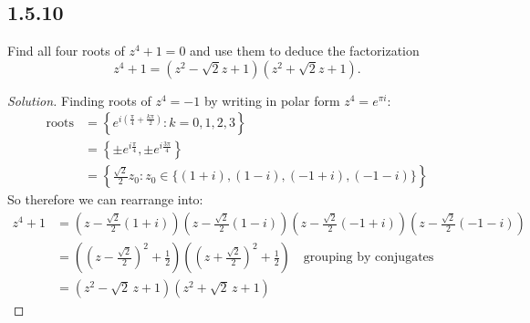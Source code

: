 \documentclass{article}
\newenvironment{solution}{
\begin{proof}[Solution]}{
\end{proof}}
\begin{document}
\subsection*{1.5.10}
Find all four roots of $z^4 + 1 = 0$ and use them to deduce the factorization
\[
  z^4 + 1 = (z^2 - \sqrt{2}z + 1)(z^2 + \sqrt{2}z + 1).
\]
\begin{solution}
  Finding roots of $z^4=-1$ by writing in polar form $z^4=e^{\pi i}$:
  \begin{align*}
    \text{roots}
    &= \left\{e^{i \left(\frac{\pi}{4} + \frac{k \pi}{2}\right)}: k = 0,1,2,3 \right\}
    \\ &= \left\{ \pm e^{i \frac{\pi}{4}}, \pm e^{i \frac{3\pi}{4}} \right\}
    \\ &= \left\{\tfrac{\sqrt{2}}{2}z_0: z_0 \in \{(1 + i),(1 - i),(-1 + i),(-1 - i)\} \right\}
  \end{align*}
  So therefore we can rearrange into:
  \begin{align*}
    z^4 + 1
    &= \left(z - \tfrac{\sqrt{2}}{2}(1 + i)\right)\left(z - \tfrac{\sqrt{2}}{2}(1 - i)\right)\left(z - \tfrac{\sqrt{2}}{2}(-1 + i)\right)\left(z - \tfrac{\sqrt{2}}{2}(-1 - i)\right)
    \\ &= \left(\left(z - \tfrac{\sqrt{2}}{2}\right)^2 + \tfrac{1}{2}\right)\left(\left(z + \tfrac{\sqrt{2}}{2}\right)^2 + \tfrac{1}{2}\right) \quad \text{grouping by conjugates}
    \\ &= \left(z^2 - \sqrt{2}\,z + 1\right)\left(z^2 + \sqrt{2}\,z + 1\right)
  \end{align*}
\end{solution}
\end{document}
